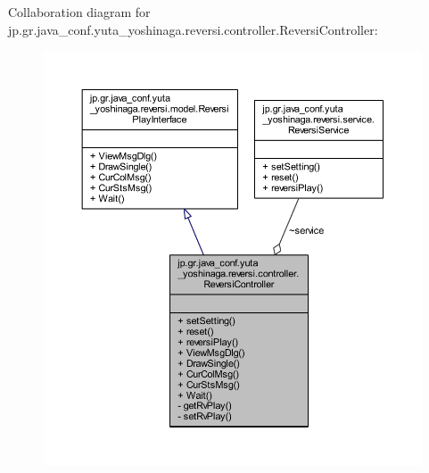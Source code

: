 Collaboration diagram for jp.\+gr.\+java\+\_\+conf.\+yuta\+\_\+yoshinaga.\+reversi.\+controller.\+Reversi\+Controller\+:
\nopagebreak
\begin{figure}[H]
\begin{center}
\leavevmode
\includegraphics[width=350pt]{classjp_1_1gr_1_1java__conf_1_1yuta__yoshinaga_1_1reversi_1_1controller_1_1_reversi_controller__coll__graph}
\end{center}
\end{figure}

